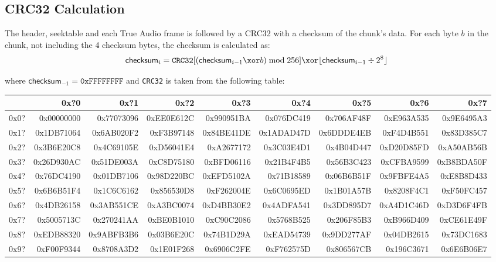 \subsection{CRC32 Calculation}
The header, seektable and each True Audio frame is followed
by a CRC32 with a checksum of the chunk's data.
For each byte $b$ in the chunk, not including the 4 checksum bytes,
the checksum is calculated as:
\begin{equation*}
\textsf{checksum}_i = \texttt{CRC32}[(\textsf{checksum}_{i - 1} \xor b) \bmod 256] \xor \lfloor\textsf{checksum}_{i - 1} \div 2 ^ 8\rfloor
\end{equation*}
\par
\noindent
where $\textsf{checksum}_{-1} = \texttt{0xFFFFFFFF}$ and
\texttt{CRC32} is taken from the following table:
\begin{table}[h]
{\ttfamily
\begin{tabular}{|r||r|r|r|r|r|r|r|r|}
\hline
 & 0x?0 & 0x?1 & 0x?2 & 0x?3 & 0x?4 & 0x?5 & 0x?6 & 0x?7 \\
\hline
0x0? &
0x00000000 &  0x77073096 &  0xEE0E612C &  0x990951BA &  0x076DC419 &  0x706AF48F &  0xE963A535 &  0x9E6495A3 \\
0x1? &
0x1DB71064 &  0x6AB020F2 &  0xF3B97148 &  0x84BE41DE &  0x1ADAD47D &  0x6DDDE4EB &  0xF4D4B551 &  0x83D385C7 \\
0x2? &
0x3B6E20C8 &  0x4C69105E &  0xD56041E4 &  0xA2677172 &  0x3C03E4D1 &  0x4B04D447 &  0xD20D85FD &  0xA50AB56B \\
0x3? &
0x26D930AC &  0x51DE003A &  0xC8D75180 &  0xBFD06116 &  0x21B4F4B5 &  0x56B3C423 &  0xCFBA9599 &  0xB8BDA50F \\
0x4? &
0x76DC4190 &  0x01DB7106 &  0x98D220BC &  0xEFD5102A &  0x71B18589 &  0x06B6B51F &  0x9FBFE4A5 &  0xE8B8D433 \\
0x5? &
0x6B6B51F4 &  0x1C6C6162 &  0x856530D8 &  0xF262004E &  0x6C0695ED &  0x1B01A57B &  0x8208F4C1 &  0xF50FC457 \\
0x6? &
0x4DB26158 &  0x3AB551CE &  0xA3BC0074 &  0xD4BB30E2 &  0x4ADFA541 &  0x3DD895D7 &  0xA4D1C46D &  0xD3D6F4FB \\
0x7? &
0x5005713C &  0x270241AA &  0xBE0B1010 &  0xC90C2086 &  0x5768B525 &  0x206F85B3 &  0xB966D409 &  0xCE61E49F \\
0x8? &
0xEDB88320 &  0x9ABFB3B6 &  0x03B6E20C &  0x74B1D29A &  0xEAD54739 &  0x9DD277AF &  0x04DB2615 &  0x73DC1683 \\
0x9? &
0xF00F9344 &  0x8708A3D2 &  0x1E01F268 &  0x6906C2FE &  0xF762575D &  0x806567CB &  0x196C3671 &  0x6E6B06E7 \\

\end{tabular}}
\end{table}
